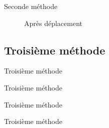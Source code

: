 \begin{frame}{Seconde méthode}
	\begin{figure}[h!]
		\centering
		\resizebox{11cm}{!}{}
		\caption{Après déplacement}
		\label{fig:deplacementMethode2-2}
	\end{figure}
\end{frame}

\subsection{Troisième méthode}
\begin{frame}{Troisième méthode}
	\begin{figure}[h!]
		\centering
		
		\label{fig:deplacementMethode3}
	\end{figure}
\end{frame}

\begin{frame}{Troisième méthode}
	\begin{figure}[h!]
		\centering
		
		\label{fig:deplacementMethode3-2}
	\end{figure}
\end{frame}

\begin{frame}{Troisième méthode}
	\begin{figure}[h!]
		\centering
		
		\label{fig:deplacementMethode3-3}
	\end{figure}
\end{frame}

\begin{frame}{Troisième méthode}
	\begin{figure}[h!]
		\centering
		
		\label{fig:deplacementMethode3-4}
	\end{figure}
\end{frame}